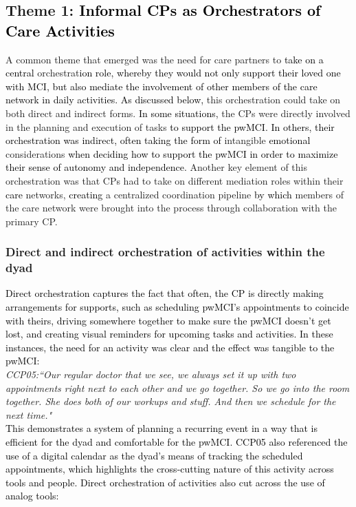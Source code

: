 \documentclass[acmsmall]{acmart}
\begin{document}
\subsection{Theme 1: \textcolor{black}{Informal CPs as Orchestrators of Care Activities}}
A common theme that emerged was the need for care partners to \textcolor{black}{take on a central} orchestrat\textcolor{black}{ion role, whereby they would not only support their loved one with MCI, but also mediate the involvement of other members of the care network in daily activities. As discussed below,} this orchestration could take on both direct and indirect forms. \textcolor{black}{In some situations,} the CPs were directly involved in the planning and execution of tasks \textcolor{black}{to support the pwMCI. In others, their orchestration was indirect, often taking the form of} intangible \textcolor{black}{emotional} considerations \textcolor{black}{when deciding how to support the pwMCI in order to maximize their sense of autonomy and independence.} Another key element of this orchestration was that CPs had to take on different mediation roles within their \textcolor{black}{care} networks, \textcolor{black}{creating} a centralized coordination pipeline \textcolor{black}{by which} members of the care network were brought into the process through collaboration with the primary CP.

\subsubsection{Direct and indirect orchestration of activities within the dyad}

\textcolor{black}{Direct orchestration captures the fact that often, the CP is directly making arrangements for supports, such as scheduling pwMCI's appointments to coincide with theirs, driving somewhere together to make sure the pwMCI doesn’t get lost, and creating visual reminders for upcoming tasks and activities. In these instances, the need for an activity was clear and the effect was tangible to the pwMCI:}
\\ 


\textit{CCP05:“Our regular doctor that we see, we always set it up with two appointments right next to each other and we go together. So we go into the room together. She does both of our workups and stuff. And then we schedule for the next time."}
\\

\textcolor{black}{This demonstrates a system of planning a recurring event in a way that is efficient for the dyad and comfortable for the pwMCI. CCP05 \textcolor{black}{also} referenced the use of a digital calendar as the dyad’s means of tracking the scheduled appointments, which highlights the cross-cutting nature of this activity across tools and people. Direct orchestration of activities also cut across the use of analog tools:}
\\
\end{document}
